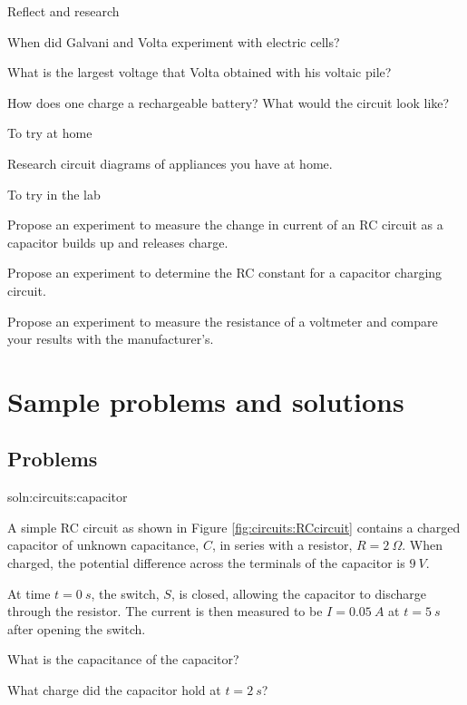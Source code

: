 \begin{chapteractivity}{Reflect and research}
{
\item When did Galvani and Volta experiment with electric cells?
\item What is the largest voltage that Volta obtained with his voltaic pile?
\item How does one charge a rechargeable battery? What would the circuit look like?
}
\end{chapteractivity}

\begin{chapteractivity}{To try at home}
{
\item Research circuit diagrams of appliances you have at home.
}
\end{chapteractivity}

\begin{chapteractivity}{To try in the lab}
{
\item Propose an experiment to measure the change in current of an RC circuit as a capacitor builds up and releases charge.
\item Propose an experiment to determine the RC constant for a capacitor charging circuit.
\item Propose an experiment to measure the resistance of a voltmeter and compare your results with the manufacturer's.
}
\end{chapteractivity}

\newpage
\section{Sample problems and solutions}

\subsection{Problems}
\begin{problemParts}{soln:circuits:capacitor}{\label{prob:circuits:capacitor} 
A simple RC circuit as shown in Figure \ref{fig:circuits:RCcircuit} contains a charged capacitor of unknown capacitance, $C$, in series with a resistor, $R=\SI{2}{\Omega}$. When charged, the potential difference across the terminals of the capacitor is $\SI{9}{V}$. 

At time $t=\SI{0}{s}$, the switch, $S$, is closed, allowing the capacitor to discharge through the resistor. The current is then measured to be $I = \SI{0.05}{A}$ at $t = \SI{5}{s}$ after opening the switch.}
{
\item What is the capacitance of the capacitor?
\item What charge did the capacitor hold at $t = \SI{2}{s}$?
}
\end{problemParts}

